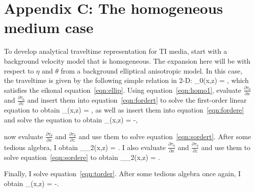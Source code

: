 \appendix
\section{Appendix C: The homogeneous medium case}

To develop analytical traveltime representation for TI media,   start with a background velocity model that is homogeneous. 
The expansion here will be with respect to $\eta$ and $\theta$ from a background elliptical anisotropic model.
In this case, the traveltime  is given by the following simple relation in 2-D:
\beq
\tau_{0}(x,z) = ,
\label{eqn:homo1}
\eeq
which satisfies the eikonal equation~\ref{eqn:ellip}. Using equation~\ref{eqn:homo1},   evaluate $\frac{\partial \tau _{0}}{\partial x}$ and
$\frac{\partial \tau _{0}}{\partial z}$ and insert them into equation~\ref{eqn:fordert} to solve the first-order linear equation to obtain 
\beq
\tau_{\theta}(x,z) = ,
\label{eqn:homo2}
\eeq
as well as insert them into equation~\ref{eqn:fordere} and solve the equation to obtain
\beq
\tau_{\eta}(x,z) = -,
\label{eqn:homo22}
\eeq

  now evaluate $\frac{\partial \tau _{\theta}}{\partial x}$ and $\frac{\partial \tau _{\theta}}{\partial z}$ and use them to solve equation~\ref{eqn:sordert}.
After some tedious algebra, I obtain
\beq
\tau_{\theta_2}(x,z) = .
\label{eqn:homo3}
\eeq
I also evaluate $\frac{\partial \tau _{\eta}}{\partial x}$ and $\frac{\partial \tau _{\eta}}{\partial z}$ 
and use them to solve equation~\ref{eqn:sordere} to obtain
\beq
\tau_{\eta_2}(x,z) = .
\label{eqn:homo32}
\eeq

Finally, I solve equation~\ref{eqn:torder}.
After some tedious algebra once again, I obtain
\beq
\tau_{\eta \theta}(x,z) = -.
\label{eqn:homo4}
\eeq

